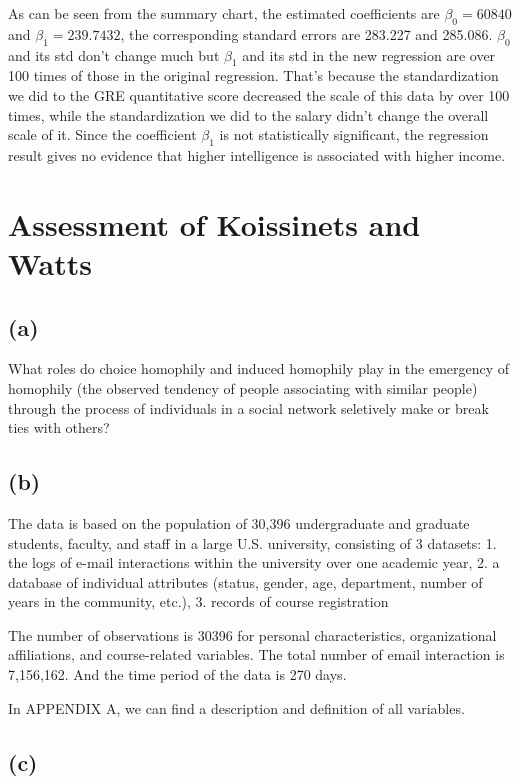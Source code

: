 \documentclass[11pt]{article}
\begin{document}
    As can be seen from the summary chart, the estimated coefficients are
\(\beta_0=60840\) and \(\beta_1=239.7432\), the corresponding standard
errors are 283.227 and 285.086. \(\beta_0\) and its std don't change
much but \(\beta_1\) and its std in the new regression are over 100
times of those in the original regression. That's because the
standardization we did to the GRE quantitative score decreased the scale
of this data by over 100 times, while the standardization we did to the
salary didn't change the overall scale of it. Since the coefficient
\(\beta_1\) is not statistically significant, the regression result
gives no evidence that higher intelligence is associated with higher
income.

    \section{Assessment of Koissinets and
Watts}\label{assessment-of-koissinets-and-watts}

    \subsection{(a)}\label{a}

What roles do choice homophily and induced homophily play in the
emergency of homophily (the observed tendency of people associating with
similar people) through the process of individuals in a social network
seletively make or break ties with others?

    \subsection{(b)}\label{b}

The data is based on the population of 30,396 undergraduate and graduate
students, faculty, and staff in a large U.S. university, consisting of 3
datasets: 1. the logs of e-mail interactions within the university over
one academic year, 2. a database of individual attributes (status,
gender, age, department, number of years in the community, etc.), 3.
records of course registration

The number of observations is 30396 for personal characteristics,
organizational affiliations, and course-related variables. The total
number of email interaction is 7,156,162. And the time period of the
data is 270 days.

In APPENDIX A, we can find a description and definition of all
variables.

    \subsection{(c)}\label{c}
\end{document}
